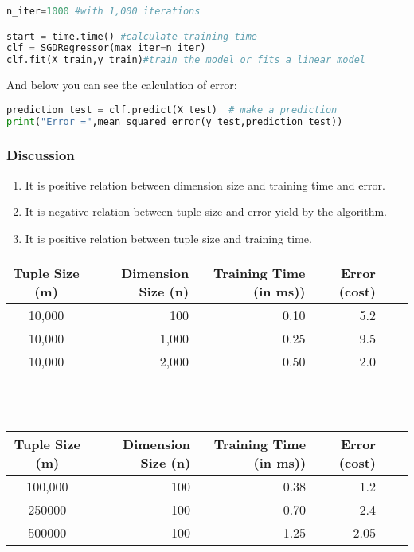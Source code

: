 \documentclass[onecolumn]{article}
\begin{document}
\begin{lstlisting}[language=Python, caption=train and test] 
n_iter=1000 #with 1,000 iterations

start = time.time() #calculate training time
clf = SGDRegressor(max_iter=n_iter)
clf.fit(X_train,y_train)#train the model or fits a linear model
\end{lstlisting} 

And below you can see the calculation of error:

\begin{lstlisting}[language=Python, caption=Prediction test] 
prediction_test = clf.predict(X_test)  # make a prediction
print("Error =",mean_squared_error(y_test,prediction_test))
\end{lstlisting} 

\subsubsection{Discussion}
\label{sec:2.0.4}

\begin{enumerate}
\item It is positive relation between dimension size and training time and error.
\item It is  negative relation between tuple size and error yield by the algorithm.
\item It is positive relation between tuple size and training time.

\end{enumerate}
\begin {tabular}{crrrrl}
\hline
Tuple Size (m)& Dimension Size (n)  &Training Time (in ms))
& Error (cost)
  \\
\hline
  10,000& 100
& 0.10&5.2\\
 10,000& 1,000
 &0.25&9.5 \\
 10,000& 2,000
& 0.50&2.0\\ 
\hline
\end{tabular}
\\\\

\begin {tabular}{crrrrl}
\hline
Tuple Size (m)& Dimension Size (n)  &Training Time (in ms))
& Error (cost)
  \\
\hline
  100,000& 
100&0.38&1.2\\ 250000
 &100
 &0.70&2.4\\
 500000&100
&1.25& 2.05\\
\hline
\end{tabular}
\\
\end{document}
